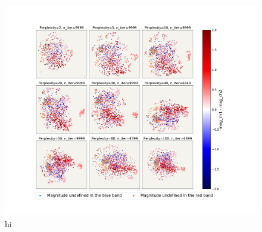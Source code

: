 \begin{figure}[h!]
    \centering
    \includegraphics[trim={5cm 3cm 5cm 3cm},clip,width=\textwidth]{Code/Saved_Figures/peplex_ch1_ch2.pdf}
    \caption{hi}
    \label{embeddding_ch1_ch2}
\end{figure}